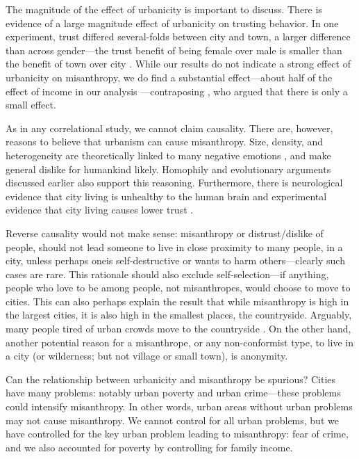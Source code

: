 \documentclass[11pt, letterpaper]{article}
\begin{document}
\begin{spacing}{1.4}
The magnitude of the effect of urbanicity is important to discuss. There is
evidence of a large magnitude effect of urbanicity on trusting behavior. In one experiment,
trust differed several-folds between city and town, a larger difference than
across gender---the trust benefit of being female over male is smaller than the
benefit of town over city \citep{milgram70}. While our results do not indicate a
 strong effect of urbanicity on misanthropy, we do find a substantial
effect---about half of the effect of income in our analysis
---contraposing \citet{wilson85}, who argued that there is only a small effect.

As in any correlational study, we cannot claim causality. There are, however,
reasons to believe that urbanism can cause misanthropy. Size, density, and
heterogeneity are theoretically linked to many negative emotions
\citep{wirth38}, and make general dislike for humankind likely. Homophily and
evolutionary arguments discussed earlier also support this reasoning. {Furthermore, there is neurological evidence that city living is unhealthy to the human brain \citep{lederbogen11} and experimental evidence that city living causes lower trust \citep{milgram70}.}

Reverse causality would not make sense: misanthropy or distrust/dislike of people, should
not lead someone to live in close proximity to many people, in a  city, unless
perhaps oneis self-destructive or wants to harm others---clearly such cases are rare. 
 This rationale should also exclude self-selection---if anything, people who
 love to be among  people, not misanthropes, would choose to move to cities. This can also perhaps explain the result that while misanthropy is high in the largest
cities, it is also high in the smallest places, the
countryside. Arguably, many people tired of urban crowds move to the
countryside \citep[e.g.,][]{deweyWP17nov23}.
 On the other hand, {another potential reason for a misanthrope, or any
   non-conformist type, to live in a city (or wilderness; but not village or
   small town), is anonymity.}

Can the relationship between urbanicity and misanthropy be spurious? Cities have
many problems: notably urban poverty and urban crime---these problems could
intensify misanthropy. In other words, urban areas without urban problems may 
not cause misanthropy.  We cannot control for all urban problems, but we have
controlled for the key urban problem leading to misanthropy: fear of crime, and
we also accounted for poverty by controlling for family income.


\end{spacing}
\end{document}
